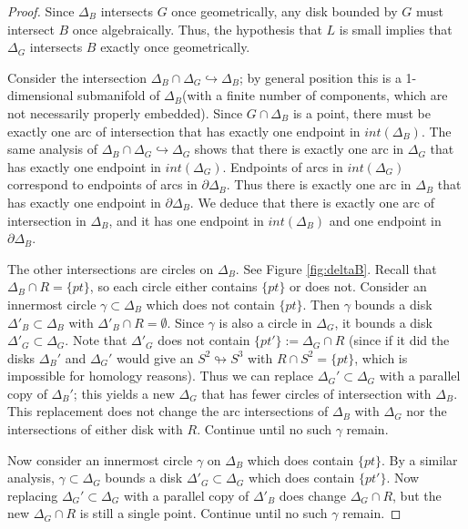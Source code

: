 \documentclass [11pt]{amsart}
\theoremstyle{remark}
\begin{document}
\begin{proof}
Since $\Delta_B$ intersects $G$ once geometrically, any disk bounded by $G$ must intersect $B$ once algebraically. Thus, the hypothesis that $L$ is small implies that $\Delta_G$ intersects $B$ exactly once geometrically. 

Consider the intersection $\Delta_B\cap\Delta_G\hookrightarrow \Delta_B$; by general position this is a 1-dimensional submanifold of $\Delta_B$(with a finite number of components, which are not necessarily properly embedded). Since $G\cap\Delta_B$ is a point, there must be exactly one arc of intersection that has exactly one endpoint in $int(\Delta_B)$. The same analysis of $\Delta_B\cap\Delta_G\hookrightarrow \Delta_G$ shows that there is exactly one arc in $\Delta_G$ that has exactly one endpoint in $int(\Delta_G)$. Endpoints of arcs in $int(\Delta_G)$ correspond to endpoints of arcs in $\partial \Delta_B$. Thus there is exactly one arc in $\Delta_B$ that has exactly one endpoint in $\partial \Delta_B$. We deduce that there is exactly one arc of intersection in $\Delta_B$, and it has one endpoint in $int(\Delta_B)$ and one endpoint in $\partial \Delta_B$. 

The other intersections are circles on $\Delta_B$. See Figure \ref{fig:deltaB}. Recall that $\Delta_B\cap R=\{pt\}$, so each circle either contains $\{pt\}$ or does not. Consider an innermost circle $\gamma\subset \Delta_B$ which does not contain $\{pt\}$. Then $\gamma$ bounds a disk $\Delta'_B \subset \Delta_B$ with $\Delta'_B \cap R = \emptyset$. Since $\gamma$ is also a circle in $\Delta_G$, it bounds a disk $\Delta'_G \subset \Delta_G$. Note that $\Delta'_G$ does not contain $\{pt'\}:=\Delta_G\cap R$ (since if it did the disks $\Delta_B'$ and $\Delta_G'$ would give an $S^2\looparrowright S^3$ with $R\cap S^2=\{pt\}$, which is impossible for homology reasons). Thus we can replace $\Delta_G'\subset \Delta_G$ with a parallel copy of $\Delta_B'$; this yields a new $\Delta_G$ that has fewer circles of intersection with $\Delta_B$. This replacement does not change the arc intersections of $\Delta_B$ with $\Delta_G$ nor the intersections of either disk with $R$. Continue until no such $\gamma$ remain.

Now consider an innermost circle $\gamma$ on $\Delta_B$ which does contain $\{pt\}$. By a similar analysis, $\gamma\subset\Delta_G$ bounds a disk $\Delta'_G \subset \Delta_G$ which does contain $\{pt'\}$. Now replacing $\Delta_G'\subset \Delta_G$ with a parallel copy of $\Delta'_B$ does change $\Delta_G\cap R$, but the new $\Delta_G\cap R$ is still a single point. Continue until no such $\gamma$ remain.  
\end{proof}
\end{document}
